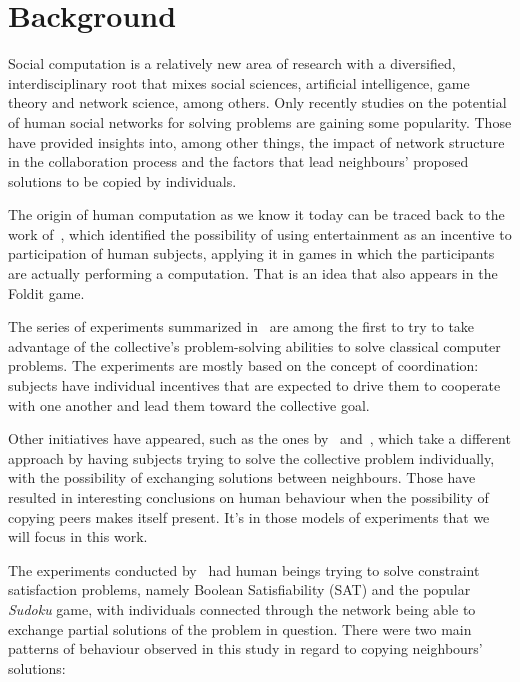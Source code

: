 \documentclass[letterpaper]{article}
\begin{document}
\section{Background}

Social computation is a relatively new area of research with a diversified, interdisciplinary root that mixes social sciences, artificial intelligence, game theory and network science, among others. Only recently studies on the potential of human social networks for solving problems are gaining some popularity. Those have provided insights into, among other things, the impact of network structure in the collaboration process and the factors that lead neighbours' proposed solutions to be copied by individuals.

The origin of human computation as we know it today can be traced back to the work of~\cite{vonahm:gwap}, which identified the possibility of using entertainment as an incentive to participation of human subjects, applying it in games in which the participants are actually performing a computation. That is an idea that also appears in the Foldit game.

The series of experiments summarized in~\cite{kearns:experim} are among the first to try to take advantage of the collective's problem-solving abilities to solve classical computer problems. The experiments are mostly based on the concept of coordination: subjects have individual incentives that are expected to drive them to cooperate with one another and lead them toward the collective goal.

Other initiatives have appeared, such as the ones by~\cite{farenzena:collabem} and~\cite{mason:collablearnet}, which take a different approach by having subjects trying to solve the collective problem individually, with the possibility of exchanging solutions between neighbours. Those have resulted in interesting conclusions on human behaviour when the possibility of copying peers makes itself present. It's in those models of experiments that we will focus in this work.

The experiments conducted by~\cite{farenzena:collabem} had human beings trying to solve constraint satisfaction problems, namely Boolean Satisfiability (SAT) and the popular \emph{Sudoku} game, with individuals connected through the network being able to exchange partial solutions of the problem in question. There were two main patterns of behaviour observed in this study in regard to copying neighbours' solutions:
\end{document}
